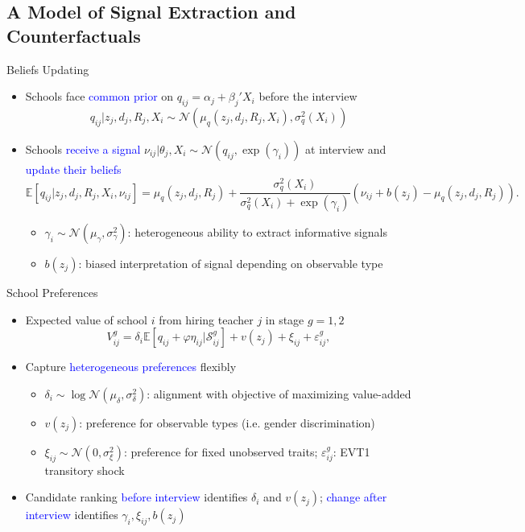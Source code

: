 \documentclass[compress,10pt,aspectratio=169]{beamer}
\newcommand\emphblue[1]{\textcolor{blue}{#1}}
\begin{document}
\subsection{A Model of Signal Extraction and Counterfactuals}



\begin{frame}{Beliefs Updating}
    \begin{itemize}
        \item Schools face \emphblue{common prior} on $q_{ij}=\alpha_j+\beta_j'X_i$ before the interview
        $$
        q_{ij}|z_j,d_j,R_j, X_i \sim \mathcal{N}(\mu_q(z_j,d_j,R_j, X_i),\sigma^2_q( X_i))
        $$
        \smallskip
        \item Schools \emphblue{receive a signal} $\nu_{ij}|\theta_j,X_i \sim \mathcal{N}(q_{ij},\exp(\gamma_i))$ at interview and \emphblue{update their beliefs}
$$
\mathbb{E}[q_{ij}|z_j,d_j,R_j, X_i, \nu_{ij}]=\mu_q(z_j,d_j,R_j)+\frac{\sigma_{q}^2( X_i)}{\sigma_{q}^2( X_i)+\exp(\gamma_i)}(\nu_{ij}+b(z_j)-\mu_q(z_j,d_j,R_j)).
$$
\begin{itemize}
    \item[$\Rightarrow$] $\gamma_i \sim \mathcal{N}(\mu_{\gamma},\sigma_{\gamma}^2)$: heterogeneous ability to extract informative signals
    \medskip
    \item[$\Rightarrow$] $b(z_j)$: biased interpretation of signal depending on observable type
\end{itemize}
    \end{itemize}
\end{frame}

\begin{frame}{School Preferences}
    \begin{itemize}
        \item Expected value of school $i$ from hiring teacher $j$ in stage $g=1,2$
$$
V_{ij}^g= \delta_i\mathbb{E}[q_{ij}+\varphi\eta_{ij}|\mathcal{S}^g_{ij}]+v(z_j)+\xi_{ij}+\varepsilon^g_{ij},
$$
    \item Capture \emphblue{heterogeneous preferences} flexibly
    \begin{itemize}
    \smallskip
    \item[$\Rightarrow$] $\delta_i \sim \log \mathcal{N}(\mu_{\delta},\sigma_{\delta}^2)$: alignment with objective of maximizing value-added
    \medskip
    \item[$\Rightarrow$] $v(z_j)$: preference for observable types (i.e. gender discrimination)
    \medskip
    \item[$\Rightarrow$] $\xi_{ij}\sim \mathcal{N}(0,\sigma_{\xi}^2)$: preference for fixed unobserved traits; $\varepsilon^g_{ij}$: EVT1 transitory shock
    \end{itemize}
    \medskip
    \item Candidate ranking \emphblue{before interview} identifies $\delta_i$ and $v(z_j)$; \emphblue{change after interview} identifies $\gamma_i,\xi_{ij},b(z_j)$
    \end{itemize}
\end{frame}
\end{document}
